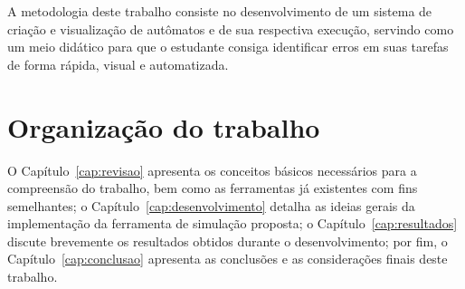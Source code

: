 A metodologia deste trabalho consiste no desenvolvimento de um sistema de criação e visualização de autômatos e de sua respectiva execução, servindo como um meio didático para que o estudante consiga identificar erros em suas tarefas de forma rápida, visual e automatizada.

\section{Organização do trabalho}

O Capítulo~\ref{cap:revisao} apresenta os conceitos básicos necessários para a compreensão do trabalho, bem como as ferramentas já existentes com fins semelhantes; o Capítulo~\ref{cap:desenvolvimento} detalha as ideias gerais da implementação da ferramenta de simulação proposta; o Capítulo~\ref{cap:resultados} discute brevemente os resultados obtidos durante o desenvolvimento; por fim, o Capítulo~\ref{cap:conclusao} apresenta as conclusões e as considerações finais deste trabalho.
